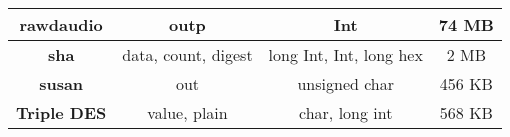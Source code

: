 \documentclass[conference]{IEEEtran}
\begin{document}
\begin{table}[t!]
{\begin{tabular}{|c|c|c|c|}
\textbf{rawdaudio}      & outp                                                                                       & Int                       & 74   MB                        \\ \hline
\textbf{sha}            & data, count, digest                                                                        & long   Int, Int, long hex & 2   MB                         \\ \hline
\textbf{susan}          & out                                                                                        & unsigned   char           & 456   KB                       \\ \hline
\textbf{Triple   DES}   & value,   plain                                                                             & char,   long int          & 568   KB                       \\ \hline
\end{tabular}}
\end{table}
\end{document}
